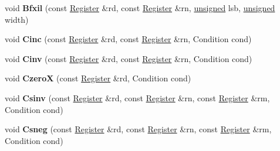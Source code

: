 \begin{DoxyCompactItemize}
\mbox{\label{classv8_1_1internal_1_1MacroAssembler_a4199d90d974f6095252998efa874c41a}} 
void {\bfseries Bfxil} (const \mbox{\hyperlink{classv8_1_1internal_1_1Register}{Register}} \&rd, const \mbox{\hyperlink{classv8_1_1internal_1_1Register}{Register}} \&rn, \mbox{\hyperlink{classunsigned}{unsigned}} lsb, \mbox{\hyperlink{classunsigned}{unsigned}} width)
\item 
\mbox{\label{classv8_1_1internal_1_1MacroAssembler_a65998fab8b23d43fcc37ad29ef7f2f55}} 
void {\bfseries Cinc} (const \mbox{\hyperlink{classv8_1_1internal_1_1Register}{Register}} \&rd, const \mbox{\hyperlink{classv8_1_1internal_1_1Register}{Register}} \&rn, Condition cond)
\item 
\mbox{\label{classv8_1_1internal_1_1MacroAssembler_ab78ee91b323f03c4d9165710a1d41c12}} 
void {\bfseries Cinv} (const \mbox{\hyperlink{classv8_1_1internal_1_1Register}{Register}} \&rd, const \mbox{\hyperlink{classv8_1_1internal_1_1Register}{Register}} \&rn, Condition cond)
\item 
\mbox{\label{classv8_1_1internal_1_1MacroAssembler_acf881e81c684b20690ae998e9377cec8}} 
void {\bfseries CzeroX} (const \mbox{\hyperlink{classv8_1_1internal_1_1Register}{Register}} \&rd, Condition cond)
\item 
\mbox{\label{classv8_1_1internal_1_1MacroAssembler_ade7e320ecba7facc6afe61ec2184d1a8}} 
void {\bfseries Csinv} (const \mbox{\hyperlink{classv8_1_1internal_1_1Register}{Register}} \&rd, const \mbox{\hyperlink{classv8_1_1internal_1_1Register}{Register}} \&rn, const \mbox{\hyperlink{classv8_1_1internal_1_1Register}{Register}} \&rm, Condition cond)
\item 
\mbox{\label{classv8_1_1internal_1_1MacroAssembler_a28c74e21e86d41648de41dcd6fcd2df9}} 
void {\bfseries Csneg} (const \mbox{\hyperlink{classv8_1_1internal_1_1Register}{Register}} \&rd, const \mbox{\hyperlink{classv8_1_1internal_1_1Register}{Register}} \&rn, const \mbox{\hyperlink{classv8_1_1internal_1_1Register}{Register}} \&rm, Condition cond)
\item 
\mbox{\label{classv8_1_1internal_1_1MacroAssembler_af767daa06a8400b05bffa60db888004a}} 

\end{DoxyCompactItemize}
